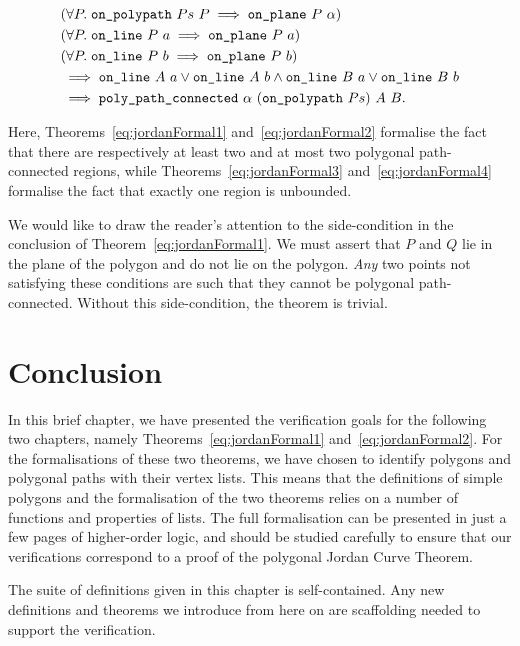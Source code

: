 \begin{equation}\label{eq:jordanFormal4}
  \begin{split}\notag
  &(\forall P.\; \code{on\_polypath}\ Ps\ P \implies \code{on\_plane}\ P\ \alpha)\\
  &(\forall P.\; \code{on\_line}\ P\ a \implies \code{on\_plane}\ P\ a)\\
  &(\forall P.\; \code{on\_line}\ P\ b \implies \code{on\_plane}\ P\ b)\\
  &\implies \code{on\_line}\ A\ a \vee \code{on\_line}\ A\ b\wedge 
  \code{on\_line}\ B\ a \vee \code{on\_line}\ B\ b\\
  &\implies \code{poly\_path\_connected}\ \alpha\ (\code{on\_polypath}\ Ps)\ A\ B.
\end{split}
\end{equation}

Here, Theorems~\ref{eq:jordanFormal1} and~\ref{eq:jordanFormal2} formalise the fact that there are respectively at least two and at most two polygonal path-connected regions, while Theorems~\ref{eq:jordanFormal3} and~\ref{eq:jordanFormal4} formalise the fact that exactly one region is unbounded.

We would like to draw the reader's attention to the side-condition in the conclusion of Theorem~\ref{eq:jordanFormal1}. We must assert that $P$ and $Q$ lie in the plane of the polygon and do not lie on the polygon. \emph{Any} two points not satisfying these conditions are such that they cannot be polygonal path-connected. Without this side-condition, the theorem is trivial.

\section{Conclusion}
In this brief chapter, we have presented the verification goals for the following two chapters, namely Theorems~\ref{eq:jordanFormal1} and~\ref{eq:jordanFormal2}. For the formalisations of these two theorems, we have chosen to identify polygons and polygonal paths with their vertex lists. This means that the definitions of simple polygons and the formalisation of the two theorems relies on a number of functions and properties of lists. The full formalisation can be presented in just a few pages of higher-order logic, and should be studied carefully to ensure that our verifications correspond to a proof of the polygonal Jordan Curve Theorem. 

The suite of definitions given in this chapter is self-contained. Any new definitions and theorems we introduce from here on are scaffolding needed to support the verification.

